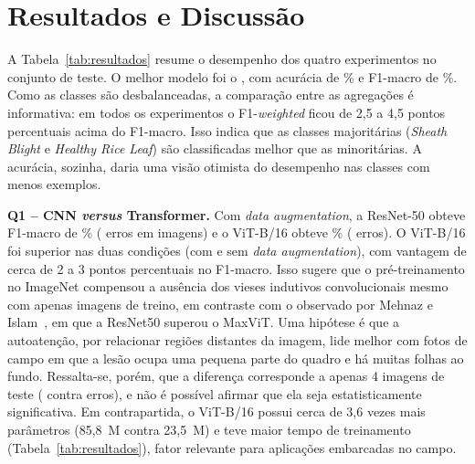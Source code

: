 \documentclass[conference]{IEEEtran}
\begin{document}
\section{Resultados e Discussão}\label{sec:resultados}



A Tabela~\ref{tab:resultados} resume o desempenho dos quatro experimentos no conjunto de teste. O melhor modelo foi o \BestLabel{}, com acurácia de \BestAcc\% e F1-macro de \BestFOne\%. Como as classes são desbalanceadas, a comparação entre as agregações é informativa: em todos os experimentos o F1-\textit{weighted} ficou de 2,5 a 4,5 pontos percentuais acima do F1-macro. Isso indica que as classes majoritárias (\textit{Sheath Blight} e \textit{Healthy Rice Leaf}) são classificadas melhor que as minoritárias. A acurácia, sozinha, daria uma visão otimista do desempenho nas classes com menos exemplos.

\textbf{Q1 -- CNN \textit{versus} Transformer.} Com \textit{data augmentation}, a ResNet-50 obteve F1-macro de \FOneResNetAug\% (\ErrorsResNetAug{} erros em \NTest{} imagens) e o ViT-B/16 obteve \FOneViTAug\% (\ErrorsViTAug{} erros). O ViT-B/16 foi superior nas duas condições (com e sem \textit{data augmentation}), com vantagem de cerca de 2 a 3 pontos percentuais no F1-macro. Isso sugere que o pré-treinamento no ImageNet compensou a ausência dos vieses indutivos convolucionais mesmo com apenas \NTrain{} imagens de treino, em contraste com o observado por Mehnaz e Islam~\cite{mehnaz2025comparative}, em que a ResNet50 superou o MaxViT. Uma hipótese é que a autoatenção, por relacionar regiões distantes da imagem, lide melhor com fotos de campo em que a lesão ocupa uma pequena parte do quadro e há muitas folhas ao fundo. Ressalta-se, porém, que a diferença corresponde a apenas 4 imagens de teste (\ErrorsViTAug{} contra \ErrorsResNetAug{} erros), e não é possível afirmar que ela seja estatisticamente significativa. Em contrapartida, o ViT-B/16 possui cerca de 3,6 vezes mais parâmetros (85,8~M contra 23,5~M) e teve maior tempo de treinamento (Tabela~\ref{tab:resultados}), fator relevante para aplicações embarcadas no campo.
\end{document}
